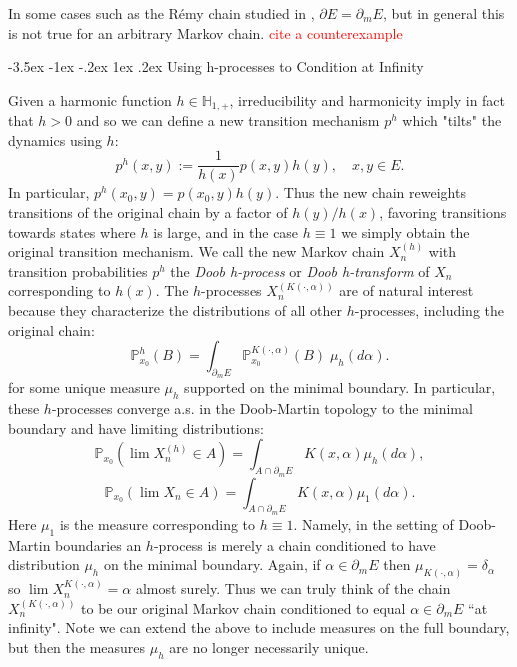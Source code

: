 \documentclass[11pt,oneside,reqno]{article}
\makeatletter
\theoremstyle{plain}
\theoremstyle{definition}
\numberwithin{equation}{section}
\def\subsection#1{\@startsection {subsection}{2}{0pt}%
{-3.5ex \@plus -1ex \@minus -.2ex}%
{1ex \@plus.2ex}%
{\bf\mathversion{bold}}{#1}}
\renewcommand{\cite}{\citet}
\newcommand{\Hn}{\mathbb{H}_{1,+}} %
\renewcommand{\P}{\mathbb{P}}
\newcommand{\red}{\textcolor{red}}
\makeatother
\begin{document}
\noindent In some cases such as the R\'emy chain studied in \cite{DM_Remy}, $\partial E = \partial_m E$, but in general this is not true for an arbitrary Markov chain. \red{cite a counterexample}




\subsection{Using h-processes to Condition at Infinity} \label{sec:h_processes}

 Given a harmonic function $h \in \Hn$, irreducibility and harmonicity imply in fact that $h > 0$ and so we can define a new transition mechanism $p^h$ which "tilts" the dynamics using $h$:
%
\begin{equation}
    p^h(x,y) := \frac{1}{h(x)} p(x,y) h(y), \quad x,y \in E.
    \label{eqn:h-process}
\end{equation}
%
\noindent In particular, $p^h(x_0, y) = p(x_0,y)h(y)$. Thus the new chain reweights transitions of the original chain by a factor of $h(y) / h(x)$, favoring transitions towards states where $h$ is large, and in the case $h \equiv 1$ we simply obtain the original transition mechanism. We call the new Markov chain $X^{(h)}_n$ with transition probabilities $p^h$ the \textit{Doob h-process} or \textit{Doob h-transform} of $X_n$ corresponding to $h(x)$.
The $h$-processes $X_n^{(K(\cdot, \alpha))}$ are of natural interest because they characterize the distributions of all other $h$-processes, including the original chain:
%
\begin{equation}
\P_{x_0}^h( B) = \int_{\partial_m E} \P_{x_0}^{K(\cdot, \alpha)}(B) \; \mu_h(d\alpha). 
    \label{eqn:K(., alpha) processes characterize h processes}
\end{equation}%
%
\noindent for some unique measure $\mu_h$ supported on the minimal boundary. In particular, these $h$-processes converge a.s. in the Doob-Martin topology to the minimal boundary and have limiting distributions:
%
\begin{equation}
    \P_{x_0}(\lim X_n^{(h)} \in A) = \int_{A \cap \partial_m E} K(x, \alpha) \mu_h(d\alpha),
    \label{eqn:limit_distribution_h-process}
\end{equation}
\begin{equation}
    \P_{x_0}(\lim X_n \in A) = \int_{A \cap \partial_m E} K(x, \alpha) \mu_1(d\alpha). 
    \label{eqn:limit_distribution_original_chain}
\end{equation}
%
\noindent Here $\mu_1$ is the measure corresponding to $h \equiv 1$. Namely, in the setting of Doob-Martin boundaries an $h$-process is merely a chain conditioned to have distribution $\mu_h$ on the minimal boundary. Again, if $\alpha \in \partial_m E$ then $\mu_{K(\cdot, \alpha)} = \delta_\alpha$ so $\lim X_n^{K(\cdot, \alpha)} = \alpha$ almost surely. Thus we can truly think of the chain $X^{(K(\cdot, \alpha))}_n$ to be our original Markov chain conditioned to equal $\alpha \in \partial_m E$  ``at infinity". Note we can extend the above to include measures on the full boundary, but then the measures $\mu_h$ are no longer necessarily unique. 
\end{document}
